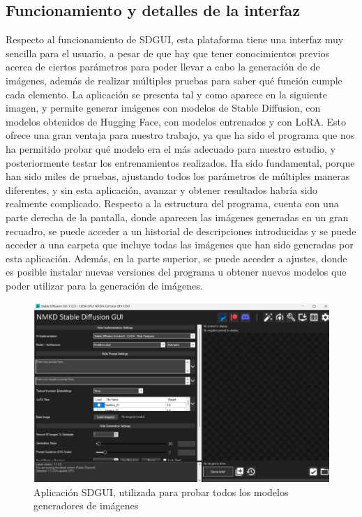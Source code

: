 \subsection{Funcionamiento y detalles de la interfaz}

Respecto al funcionamiento de SDGUI, esta plataforma tiene una interfaz muy sencilla para el usuario, a pesar de que hay que tener conocimientos previos acerca de ciertos parámetros para poder llevar a cabo la generación de de imágenes, además de realizar múltiples pruebas para saber qué función cumple cada elemento. La aplicación se presenta tal y como aparece en la siguiente imagen, y permite generar imágenes con modelos de Stable Diffusion, con modelos obtenidos de Hugging Face, con modelos entrenados y con LoRA. Esto ofrece una gran ventaja para nuestro trabajo, ya que ha sido el programa que nos ha permitido probar qué modelo era el más adecuado para nuestro estudio, y posteriormente testar los entrenamientos realizados. Ha sido fundamental, porque han sido miles de pruebas, ajustando todos los parámetros de múltiples maneras diferentes, y sin esta aplicación, avanzar y obtener resultados habría sido realmente complicado. Respecto a la estructura del programa, cuenta con una parte derecha de la pantalla, donde aparecen las imágenes generadas en un gran recuadro, se puede acceder a un historial de descripciones introducidas y se puede acceder a una carpeta que incluye todas las imágenes que han sido generadas por esta aplicación. Además, en la parte superior, se puede acceder a ajustes, donde es posible instalar nuevas versiones del programa u obtener nuevos modelos que poder utilizar para la generación de imágenes. \\


\begin{figure}[h]
	\centering
	\includegraphics[width = 1
	\textwidth]{Imagenes/Vectorial/nmkdsdgui.png}
	\caption{Aplicación SDGUI, utilizada para probar todos los modelos generadores de imágenes }
	\label{fig:nmkdsdgui}
\end{figure}

